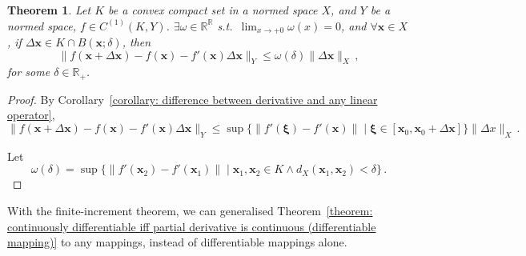 \documentclass[openany]{book}
\theoremstyle{plain}
\newtheorem{theorem}{Theorem}[section] %
\theoremstyle{definition}
\newcommand*{\bv}{\boldsymbol} %
\begin{document}
\begin{theorem}
	Let $K$ be a convex compact set in a normed space $X$, and $Y$ be a normed space, $f \in C^{(1)}(K, Y)$. 
	$\exists \omega \in \mathbb R^\mathbb R$ s.t.\ $\lim_{x \to + 0} \omega(x) = 0$, and $\forall \bv x \in X$, if $\Delta \bv x \in K \cap B(\bv x; \delta)$, then
	\begin{equation*}
		\|f(\bv x + \Delta \bv x) - f(\bv x) - f'(\bv x) \Delta \bv x\|_Y
			\leq \omega(\delta) \|\Delta \bv x\|_X\,,
	\end{equation*}
	for some $\delta \in \mathbb R_+$.
\end{theorem}
\begin{proof}
	By Corollary~\ref{corollary: difference between derivative and any linear operator}, 
	\begin{equation*}
		\|f(\bv x + \Delta \bv x) - f(\bv x) - f'(\bv x) \Delta \bv x\|_Y
			\leq \sup \big\{\|f'(\bv \xi) - f'(\bv x)\|  
				\mid \bv \xi \in [\bv x_0, \bv x_0 + \Delta \bv x]\big\}
				\|\Delta x\|_X\,.
	\end{equation*}

	Let
	\begin{equation*}
		\omega(\delta) 
		= \sup\big\{\|f'(\bv x_2) - f'(\bv x_1)\| \mid \bv x_1, \bv x_2 \in K 
			\wedge d_X(\bv x_1, \bv x_2) < \delta\big\}\,.
	\end{equation*}
\end{proof}

With the finite-increment theorem, we can generalised Theorem~\ref{theorem: continuously differentiable iff partial derivative is continuous (differentiable mapping)} to any mappings, instead of differentiable mappings alone.
\end{document}
